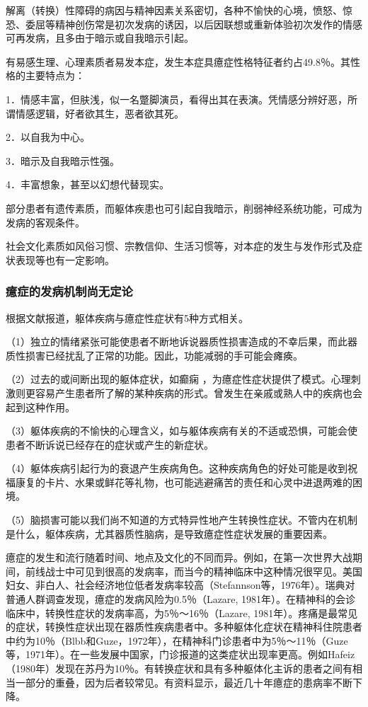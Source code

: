 解离（转换）性障碍的病因与精神因素关系密切，各种不愉快的心境，愤怒、惊恐、委屈等精神创伤常是初次发病的诱因，以后因联想或重新体验初次发作的情感可再发病，且多由于暗示或自我暗示引起。

有易感生理、心理素质者易发本症，发生本症具癔症性格特征者约占49.8％。其性格的主要特点为：

1．情感丰富，但肤浅，似一名蹩脚演员，看得出其在表演。凭情感分辨好恶，所谓情感逻辑，好者欲其生，恶者欲其死。

2．以自我为中心。

3．暗示及自我暗示性强。

4．丰富想象，甚至以幻想代替现实。

部分患者有遗传素质，而躯体疾患也可引起自我暗示，削弱神经系统功能，可成为发病的客观条件。

社会文化素质如风俗习惯、宗教信仰、生活习惯等，对本症的发生与发作形式及症状表现等也有一定影响。

\subsubsection{癔症的发病机制尚无定论}

根据文献报道，躯体疾病与癔症性症状有5种方式相关。

（1）独立的情绪紧张可能使患者不断地诉说器质性损害造成的不幸后果，而此器质性损害已经扰乱了正常的功能。因此，功能减弱的手可能会瘫痪。

（2）过去的或间断出现的躯体症状，如癫痫
，为癔症性症状提供了模式。心理刺激则更容易产生患者所了解的某种疾病的形式。曾发生在亲戚或熟人中的疾病也会起到这种作用。

（3）躯体疾病的不愉快的心理含义，如与躯体疾病有关的不适或恐惧，可能会使患者不断诉说已经存在的症状或产生的新症状。

（4）躯体疾病引起行为的衰退产生疾病角色。这种疾病角色的好处可能是收到祝福康复的卡片、水果或鲜花等礼物，也可能逃避痛苦的责任和心灵中进退两难的困境。

（5）脑损害可能以我们尚不知道的方式特异性地产生转换性症状。不管内在机制是什么，躯体疾病，尤其器质性脑病，是导致癔症性症状发展的重要因素。

癔症的发生和流行随着时间、地点及文化的不同而异。例如，在第一次世界大战期间，前线战士中可见到很高的发病率，而当今的精神临床中这种情况很罕见。美国妇女、非白人、社会经济地位低者发病率较高（Stefannson等，1976年）。瑞典对普通人群调查发现，癔症的发病风险为0.5％（Lazare,
1981年）。在精神科的会诊临床中，转换性症状的发病率高，为5％～16％（Lazare,
1981年）。疼痛是最常见的症状，转换性症状出现在器质性疾病患者中。多种躯体化症状在精神科住院患者中约为10％（Blbb和Guze，1972年），在精神科门诊患者中为5％～11％（Guze等，1971年）。在一些发展中国家，门诊报道的这类症状出现率更高。例如Hafeiz（1980年）发现在苏丹为10％。有转换症状和具有多种躯体化主诉的患者之间有相当一部分的重叠，因为后者较常见。有资料显示，最近几十年癔症的患病率不断下降。


